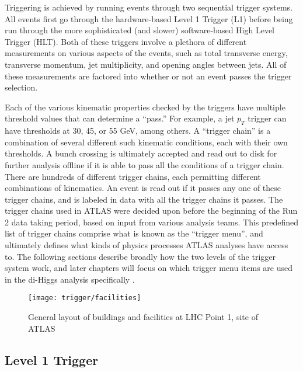     Triggering is achieved by running events through two sequential trigger systems.
    All events first go through the hardware-based Level 1 Trigger (L1) before being run through the more sophisticated (and slower) software-based High Level Trigger (HLT).
    Both of these triggers involve a plethora of different measurements on various aspects of the events, such as total transverse energy, transverse momentum, jet multiplicity, and opening angles between jets.
    All of these measurements are factored into whether or not an event passes the trigger selection.

    Each of the various kinematic properties checked by the triggers have multiple threshold values that can determine a ``pass.''
    For example, a jet $p_T$ trigger can have thresholds at 30, 45, or 55 GeV, among others.
    A ``trigger chain'' is a combination of several different such kinematic conditions, each with their own thresholds.
    A bunch crossing is ultimately accepted and read out to disk for further analysis offline if it is able to pass all the conditions of a trigger chain.
    There are hundreds of different trigger chains, each permitting different combinations of kinematics.
    An event is read out if it passes any one of these trigger chains, and is labeled in data with all the trigger chains it passes.
    The trigger chains used in ATLAS were decided upon before the beginning of the Run 2 data taking period, based on input from various analysis teams.
    This predefined list of trigger chains comprise what is known as the ``trigger menu'', and ultimately defines what kinds of physics processes ATLAS analyses have access to.
    The following sections describe broadly how the two levels of the trigger system work, and later chapters will focus on which trigger menu items are used in the di-Higgs analysis specifically .

    \begin{figure}[h]
        \texttt{[image: trigger/facilities]}
        \caption{General layout of buildings and facilities at LHC Point 1, site of ATLAS \cite{trigger_tdr}}
        \label{fig:facilities}
    \end{figure}


    \subsection{Level 1 Trigger}

